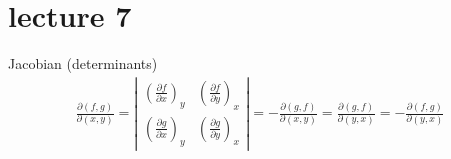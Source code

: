 \section{lecture 7}
\begin{defn}
    Jacobian (determinants)
\begin{align*}
\frac{\partial (f,g)}{\partial (x,y)} 
= \left| \begin{array}{cc} 
\left( \frac{\partial f}{\partial x} \right)_y & \left( \frac{\partial f}{\partial y} \right)_x \\ 
\left( \frac{\partial g}{\partial x} \right)_y & \left( \frac{\partial g}{\partial y} \right)_x 
\end{array} \right| 
= - \frac{\partial (g,f)}{\partial (x,y)} 
= \frac{\partial (g,f)}{\partial (y,x)} 
= - \frac{\partial (f,g)}{\partial (y,x)}
\end{align*}
\end{defn}

